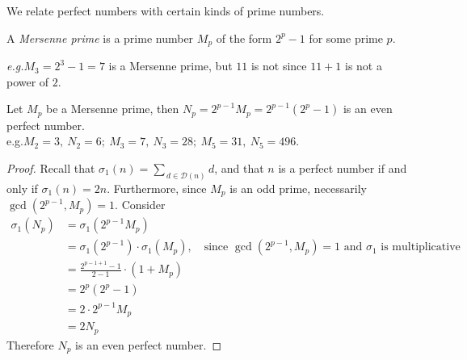 \vspace*{1em}

We relate perfect numbers with certain kinds of prime numbers.

\vspace*{1em}

\begin{definition}
A \emph{Mersenne prime} is a prime number $M_p$ of the form $2^p - 1$ for some prime $p$.
\end{definition}
\emph{e.g.}\quad $M_3 = 2^3 - 1 = 7$ is a Mersenne prime, but $11$ is not since $11+1$ is not a power of $2$.

\vspace*{1em}

\begin{theorem}[Euclid]\label{mersiseven}
Let $M_p$ be a Mersenne prime, then $N_p = 2^{p-1}M_p = 2^{p-1}(2^p - 1)$ is an even perfect number.
\vspace*{0.5em}\\
e.g.\quad $M_2 = 3,\ N_2 = 6;\ M_3 = 7,\ N_3 = 28;\ M_5 = 31,\ N_5 = 496$.
\end{theorem}
\begin{proof}
Recall that $\sigma_1(n) = \sum_{\,d\in \mathscr{D}(n)}d$, and that $n$ is a perfect number if and only if $\sigma_1(n) = 2n$. Furthermore, since $M_p$ is an odd prime, necessarily $\gcd(2^{p-1},M_p) = 1$. Consider
\begin{align*}
\sigma_1(N_p) &= \sigma_1(2^{p-1}M_p)\\[0.5em]
&= \sigma_1(2^{p-1})\cdot\sigma_1(M_p),\quad \text{since $\gcd(2^{p-1},M_p) = 1$ and $\sigma_1$ is multiplicative}\\[0.5em]
&= \frac{2^{p-1+1} - 1}{2 - 1}\cdot(1 + M_p)\\[0.5em]
&= 2^p(2^p - 1)\\[0.5em]
&= 2\cdot 2^{p-1}M_p\\[0.5em]
&= 2N_p
\end{align*}
Therefore $N_p$ is an even perfect number.
\end{proof}

\vspace*{1em}

